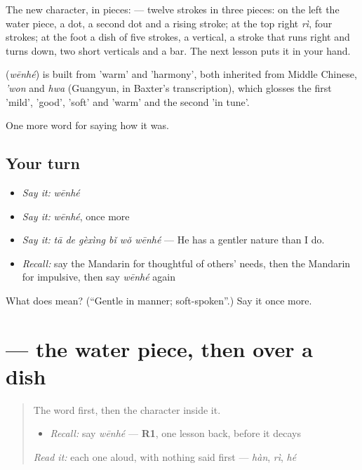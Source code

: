 The new character, in pieces:  — twelve strokes in three pieces: on the left the water piece, a dot, a second dot and a rising stroke; at the top right  \emph{rì}, four strokes; at the foot a dish of five strokes, a vertical, a stroke that runs right and turns down, two short verticals and a bar. The next lesson puts it in your hand.

\begin{cousinweb}
\textbf{} (\emph{wēnhé}) is built from  'warm' and  'harmony', both inherited from Middle Chinese, \emph{'won} and \emph{hwa} (Guangyun, in Baxter's transcription), which glosses the first 'mild', 'good', 'soft' and 'warm' and the second 'in tune'.
\end{cousinweb}

\begin{grammarlens}[title={What you've built}]
One more word for saying how it was.
\end{grammarlens}

\subsection*{Your turn}
\begin{itemize}
\raggedright
  \item \emph{Say it:} \emph{wēnhé}
  \item \emph{Say it:} \emph{wēnhé}, once more
  \item \emph{Say it:} \emph{tā de gèxìng bǐ wǒ wēnhé} — He has a gentler nature than I do.
  \item \emph{Recall:} say the Mandarin for thoughtful of others' needs, then the Mandarin for impulsive, then say \emph{wēnhé} again
\end{itemize}

\begin{tcolorbox}[breakable,colback=teal!4,colframe=teal!35!black,title={Before you move on}]
What does  mean? (\textquotedblleft{}Gentle in manner; soft-spoken\textquotedblright{}.) Say it once more.
\end{tcolorbox}
\section[\texorpdfstring{\zh{温} (wēn)}{温 (wēn)}]{ — the water piece, then  over a dish}

\label{lesson:ZH-W469-wen-warm}



\begin{quote}
The word first, then the character inside it.

\begin{itemize}
\raggedright
  \item \emph{Recall:} say \emph{wēnhé} — \textbf{R1}, one lesson back, before it decays
\end{itemize}

\begin{quote}
  
\end{quote}

\emph{Read it:} each one aloud, with nothing said first — \emph{hàn}, \emph{rì}, \emph{hé}
\end{quote}

